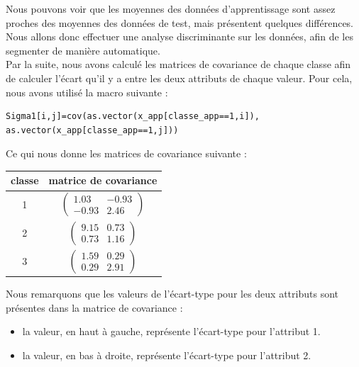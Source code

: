 \documentclass[a4paper,11pt]{article}
\begin{document}
  Nous pouvons voir que les moyennes des données d'apprentissage sont
  assez proches des moyennes des données de test, mais présentent
  quelques différences. Nous allons donc effectuer une analyse
  discriminante sur les données, afin de les segmenter de manière
  automatique.\\
  
  Par la suite, nous avons calculé les matrices de covariance de
  chaque classe afin de calculer l'écart qu'il y a entre les deux
  attributs de chaque valeur. Pour cela, nous avons utilisé la macro
  suivante :
  
  \begin{lstlisting}[caption=Calcul de covariance de la classe d'apprentissage 1]
  Sigma1[i,j]=cov(as.vector(x_app[classe_app==1,i]), as.vector(x_app[classe_app==1,j]))
  \end{lstlisting}
  
  Ce qui nous donne les matrices de covariance suivante : 
  \begin{center}
    \begin{tabular}{|c|c|}
    \hline
    classe & matrice de covariance\\
    \hline
    1 & 
    $\begin{pmatrix}
     1.03 & -0.93\\
     -0.93 & 2.46
    \end{pmatrix}$\\
    \hline
    2 & 
    $\begin{pmatrix}
     9.15 & 0.73\\
     0.73 & 1.16
    \end{pmatrix}$\\
    \hline
    3 & 
    $\begin{pmatrix}
     1.59 & 0.29\\
     0.29 & 2.91
    \end{pmatrix}$\\
    \hline
    \end{tabular}
  \end{center}
  
  Nous remarquons que les valeurs de l'écart-type pour les deux attributs sont présentes dans la matrice
  de covariance :
  \begin{itemize}
   \item la valeur, en haut à gauche, représente l'écart-type pour l'attribut 1.
   \item la valeur, en bas à droite, représente l'écart-type pour l'attribut 2.
  \end{itemize}
  
\end{document}
